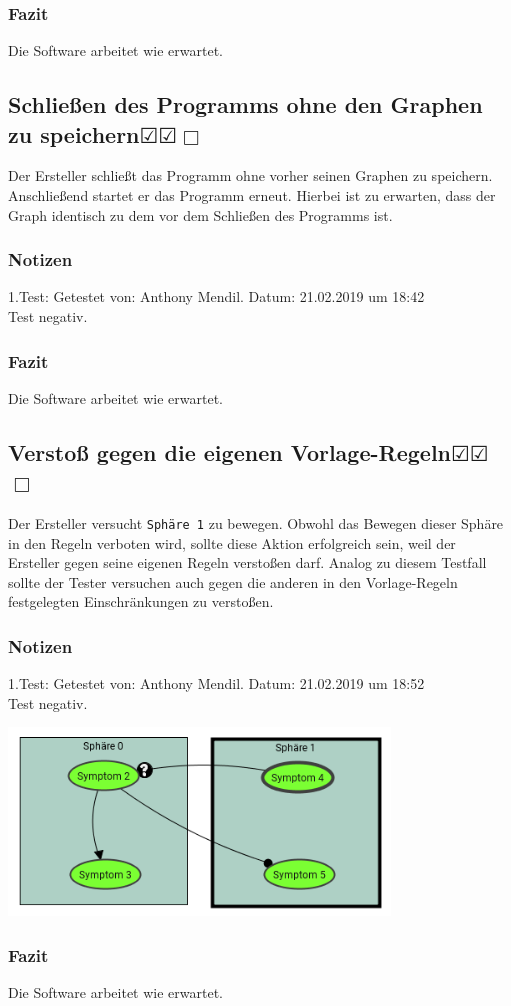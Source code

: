 \documentclass{scrartcl}
\newcommand{\subsectiont}[2]{\subsection[#1]{#1{\normalsize\normalfont #2}}}
\newcommand{\leer}{$\Box$}
\newcommand{\ok}{$\CheckedBox$}
\begin{document}
\subsubsection{Fazit}
Die Software arbeitet wie erwartet.

\subsectiont{Schließen des Programms ohne den Graphen zu speichern}{\dotfill\ok\ok\leer}
Der Ersteller schließt das Programm ohne vorher seinen Graphen zu speichern. Anschließend startet er das Programm erneut. Hierbei ist zu erwarten, dass der Graph identisch zu dem vor dem Schließen des Programms ist. 
\subsubsection{Notizen}
1.Test: Getestet von: Anthony Mendil. Datum: 21.02.2019 um 18:42 \\
Test negativ.
\subsubsection{Fazit}
Die Software arbeitet wie erwartet. 

\subsectiont{Verstoß gegen die eigenen Vorlage-Regeln}{\dotfill\ok\ok\leer}
Der Ersteller versucht \texttt{Sphäre 1} zu bewegen. Obwohl das Bewegen dieser Sphäre in den Regeln verboten wird, sollte diese Aktion erfolgreich sein, weil der Ersteller gegen seine eigenen Regeln verstoßen darf. Analog zu diesem Testfall sollte der Tester versuchen auch gegen die anderen in den Vorlage-Regeln festgelegten Einschränkungen zu verstoßen. 
\subsubsection{Notizen}
1.Test: Getestet von: Anthony Mendil. Datum: 21.02.2019 um 18:52 \\
Test negativ.
\begin{center}
\includegraphics[height=5cm]{1_11.PNG}
\end{center}
\subsubsection{Fazit}
Die Software arbeitet wie erwartet.
\end{document}
